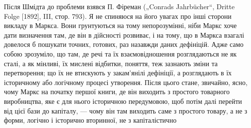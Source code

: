 Після Шмідта до проблеми взявся П. Фіреман („Conrads
Jahrbücher“, Dritte Folge [1892], III, стор. 793). Я не спиняюся на
його увагах про інші сторони викладу в Маркса. Вони грунтуються
на тому непорозумінні, ніби Маркс хоче дати визначення
там, де він в дійсності розвиває, і на тому, що в Маркса взагалі
довелося б пошукати точних, готових, раз назавжди даних
дефініцій. Адже само собою зрозуміло, що там, де речі та їх
взаємовідношення розглядаються не як сталі, а як мінливі, їх
мислені відбитки, поняття, теж зазнають зміни та перетворення;
що їх не втискують у закам’янілі дефініції, а розглядають в їх
історичному або логічному процесі утворення. Після цього стане,
звичайно, ясно, чому Маркс на початку першої книги, де він
виходить з простого товарного виробництва, яке є для нього
історичною передумовою, щоб потім далі перейти від цієї бази
до капіталу, — чому він там виходить саме з простого товару,
а не з форми, логічно і історично вторинної, не з капіталістично
\parbreak{}  %
